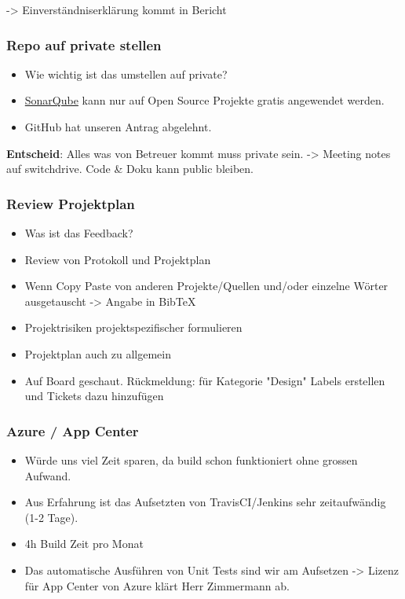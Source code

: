 -\textgreater{} Einverständniserklärung kommt in Bericht

\hypertarget{repo-auf-private-stellen}{%
\subsubsection*{Repo auf private
stellen}\label{repo-auf-private-stellen}}

\begin{itemize}

\item
  Wie wichtig ist das umstellen auf private?
\item
  \href{https://sonarcloud.io/about}{SonarQube} kann nur auf Open Source
  Projekte gratis angewendet werden.
\item
  GitHub hat unseren Antrag abgelehnt.
\end{itemize}
\textbf{Entscheid}: Alles was von Betreuer kommt muss private sein.
-\textgreater{} Meeting notes auf switchdrive. Code \& Doku kann public
bleiben.

\hypertarget{review-projektplan}{%
\subsubsection*{Review Projektplan}\label{review-projektplan}}

\begin{itemize}
\item
  Was ist das Feedback?
\item
  Review von Protokoll und Projektplan
\item
  Wenn Copy Paste von anderen Projekte/Quellen und/oder einzelne Wörter
  ausgetauscht -\textgreater{} Angabe in BibTeX
\item
  Projektrisiken projektspezifischer formulieren
\item
  Projektplan auch zu allgemein
\item
  Auf Board geschaut. Rückmeldung: für Kategorie "Design" Labels
  erstellen und Tickets dazu hinzufügen
\end{itemize}

\hypertarget{azure-ux2f-app-center}{%
\subsubsection*{Azure / App Center}\label{azure-ux2f-app-center}}

\begin{itemize}

\item
  Würde uns viel Zeit sparen, da build schon funktioniert ohne grossen
  Aufwand.
\item
  Aus Erfahrung ist das Aufsetzten von TravisCI/Jenkins sehr
  zeitaufwändig (1-2 Tage).
\item
  4h Build Zeit pro Monat
\item
  Das automatische Ausführen von Unit Tests sind wir am Aufsetzen
  -\textgreater{} Lizenz für App Center von Azure klärt Herr Zimmermann
  ab.
\end{itemize}

